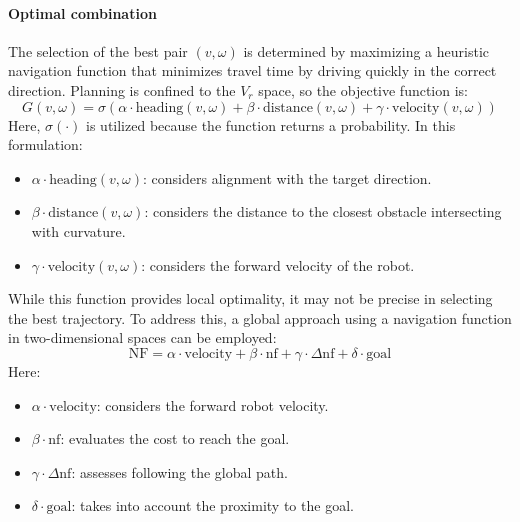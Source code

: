 \paragraph*{Optimal combination}
The selection of the best pair $(v,\omega)$ is determined by maximizing a heuristic navigation function that minimizes travel time by driving quickly in the correct direction.
Planning is confined to the $V_r$ space, so the objective function is:
\[G(v,\omega)=\sigma\left(\alpha\cdot \text{heading}(v,\omega)+\beta\cdot\text{distance}(v,\omega)+\gamma\cdot \text{velocity}(v,\omega)\right)\]
Here, $\sigma(\cdot)$ is utilized because the function returns a probability. 
In this formulation:
\begin{itemize}
    \item $\alpha\cdot \text{heading}(v,\omega)$: considers alignment with the target direction.
    \item $\beta\cdot\text{distance}(v,\omega)$: considers the distance to the closest obstacle intersecting with curvature.
    \item $\gamma\cdot \text{velocity}(v,\omega)$: considers the forward velocity of the robot.
\end{itemize}

While this function provides local optimality, it may not be precise in selecting the best trajectory. 
To address this, a global approach using a navigation function in two-dimensional spaces can be employed:
\[\text{NF}=\alpha\cdot\text{velocity}+\beta\cdot\text{nf}+\gamma\cdot\Delta\text{nf}+\delta\cdot\text{goal}\]
Here:
\begin{itemize}
    \item $\alpha\cdot\text{velocity}$: considers the forward robot velocity.
    \item $\beta\cdot\text{nf}$: evaluates the cost to reach the goal.
    \item $\gamma\cdot\Delta\text{nf}$: assesses following the global path.
    \item $\delta\cdot\text{goal}$: takes into account the proximity to the goal.
\end{itemize}

